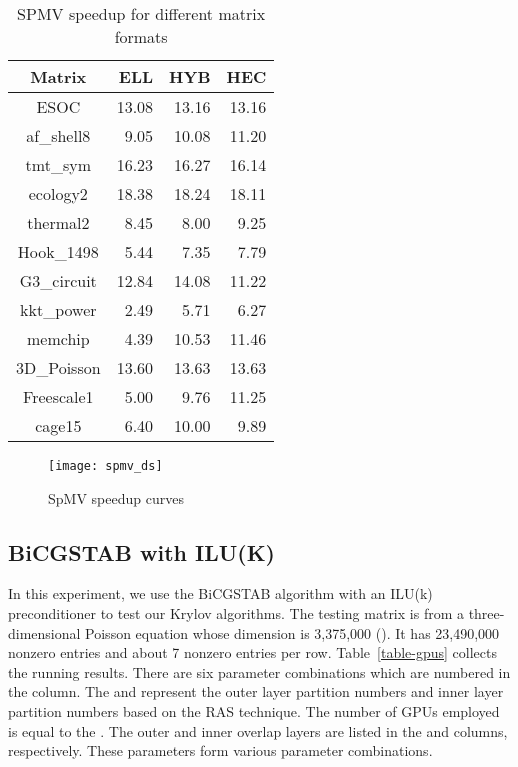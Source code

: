 \documentclass[runningheads,a4paper]{llncs}
\begin{document}
{\begin{table}[!htb]
\centering
\caption{SPMV speedup for different matrix formats}
\begin{tabular}{|c|r|r|r|} \hline
\bfseries Matrix    &\bfseries  ELL &\bfseries  HYB &\bfseries  HEC \\ \hline
ESOC	       &13.08	  &13.16	      &13.16\\ \hline
af\_shell8	   &9.05	  &10.08	      &11.20\\ \hline
tmt\_sym	   &16.23	  &16.27	      &16.14\\ \hline
ecology2	   &18.38	  &18.24	      &18.11\\ \hline
thermal2	   &8.45	  &8.00	          &9.25\\ \hline
Hook\_1498	   &5.44	  &7.35	          &7.79\\ \hline
G3\_circuit	   &12.84	  &14.08	      &11.22\\ \hline
kkt\_power	   &2.49	  &5.71	          &6.27\\ \hline
memchip	       &4.39	  &10.53	      &11.46\\ \hline
3D\_Poisson	   &13.60	  &13.63	      &13.63\\ \hline
Freescale1	   &5.00	  &9.76	          &11.25\\ \hline
cage15	       &6.40	  &10.00	      &9.89\\ \hline
\end{tabular}
\label{tbl_double_single}
\end{table}

\begin{figure}[!tbh]
    \centering
    \texttt{[image: spmv\_ds]}
    \caption{SpMV speedup curves}
    \label{fig_spmv}
\end{figure}

\subsection{BiCGSTAB with ILU(K)}

In this experiment, we use the BiCGSTAB algorithm with an ILU(k) preconditioner to test our Krylov algorithms. The testing matrix is from a three-dimensional Poisson equation whose dimension is 3,375,000 (). It has 23,490,000 nonzero entries and about 7 nonzero entries per row. Table~\ref{table-gpus} collects the running results. There are six parameter combinations which are numbered in the  column. The  and  represent the outer layer partition numbers and inner layer partition numbers based on the RAS technique. The number of GPUs employed is equal to the . The outer and inner overlap layers are listed in the  and  columns, respectively. These parameters form various parameter combinations.

}
\end{document}
